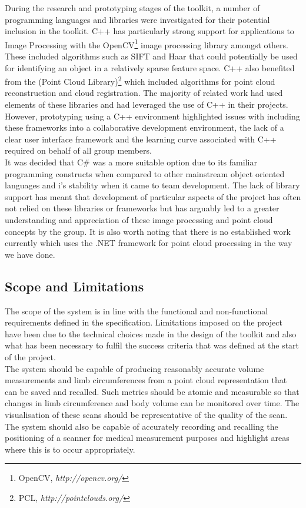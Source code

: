 During the research and prototyping stages of the toolkit, a number of programming languages and libraries were investigated for their potential inclusion in the toolkit. C++ has particularly strong support for applications to Image Processing with the OpenCV\footnote{OpenCV, \emph{http://opencv.org/}} image processing library amongst others. These included algorithms such as SIFT and Haar that could potentially be used for identifying an object in a relatively sparse feature space. C++ also benefited from the (Point Cloud Library)\footnote{PCL, \emph{http://pointclouds.org/}} which included algorithms for point cloud reconstruction and cloud registration. The majority of related work had used elements of these libraries and had leveraged the use of C++ in their projects. However, prototyping using a C++ environment highlighted issues with including these frameworks into a collaborative development environment, the lack of a clear user interface framework and the learning curve associated with C++ required on behalf of all group members. \\

It was decided that C\# was a more suitable option due to its familiar programming constructs when compared to other mainstream object oriented languages and i's stability when it came to team development. The lack of library support has meant that development of particular aspects of the project has often not relied on these libraries or frameworks but has arguably led to a greater understanding and appreciation of these image processing and point cloud concepts by the group. It is also worth noting that there is no established work currently which uses the .NET framework for point cloud processing in the way we have done.

\subsection{Scope and Limitations}

The scope of the system is in line with the functional and non-functional requirements defined in the specification. Limitations imposed on the project have been due to the technical choices made in the design of the toolkit and also what has been necessary to fulfil the success criteria that was defined at the start of the project. \\

The system should be capable of producing reasonably accurate volume measurements and limb circumferences from a point cloud representation that can be saved and recalled. Such metrics should be atomic and measurable so that changes in limb circumference and body volume can be monitored over time. The visualisation of these scans should be representative of the quality of the scan. The system should also be capable of accurately recording and recalling the positioning of a scanner for medical measurement purposes and highlight areas where this is to occur appropriately. \\

